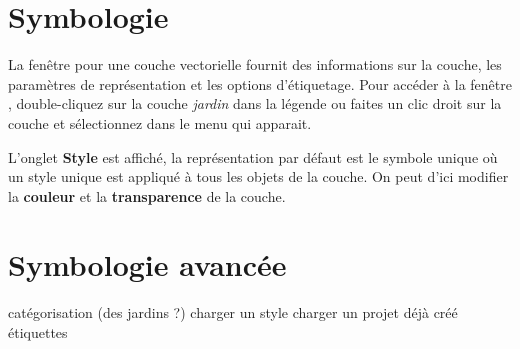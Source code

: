 
\section{Symbologie}\label{sec:} 

La fenêtre  pour une couche vectorielle fournit des informations sur la couche, les paramètres de représentation et les options d'étiquetage. Pour accéder à la fenêtre , double-cliquez sur la couche \textit{jardin} dans la légende ou faites un clic droit sur la couche et sélectionnez  dans le menu qui apparait.

L'onglet \textbf{Style} est affiché, la représentation par défaut est le symbole unique où un style unique est appliqué à tous les objets de la couche. On peut d'ici modifier la \textbf{couleur} et la \textbf{transparence} de la couche.
        
\section{Symbologie avancée}\label{sec:} 
        catégorisation (des jardins ?)
        charger un style
        charger un projet déjà créé
        étiquettes 